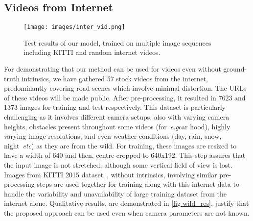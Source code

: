 \documentclass{bmvc2k}
\def\eg{\emph{e.g}\bmvaOneDot}
\def\etc{\emph{etc}\bmvaOneDot}
\begin{document}
\vspace{-5pt}
\subsection{Videos from Internet}
\label{subsec:wild}
\begin{figure}[!htbp]
\vspace{-8pt}
\begin{center}
\texttt{[image: images/inter\_vid.png]}
\end{center}
\vspace{-30pt}
  \caption{Test results of our model, trained on multiple image sequences including KITTI and random internet videos.}
\label{fig wild_res}
\end{figure}


For demonstrating that our method can be used for videos even without ground-truth intrinsics, we have gathered 57 stock videos from the internet, predominantly covering road scenes which involve minimal distortion. The URLs of these videos will be made public. After pre-processing, it resulted in 7623 and 1373 images for training and test respectively. This dataset is particularly challenging as it involves different camera setups, also with varying camera heights, obstacles present throughout some videos (for~\eg car hood), highly varying image resolutions, and even weather conditions (day, rain, snow, night~\etc) as they are from the wild. For training, these images are resized to have a width of 640 and then, centre cropped to 640x192. This step assures that the input image is not stretched, although some vertical field of view is lost. Images from KITTI 2015 dataset~\cite{geiger2012we}, without intrinsics, involving similar pre-processing steps are used together for training along with this internet data to handle the variability and unavailability of large training dataset from the internet alone. Qualitative results, are demonstrated in \autoref{fig wild_res}, justify that the proposed approach can be used even when camera parameters are not known.

\vspace{-4mm}
\end{document}
